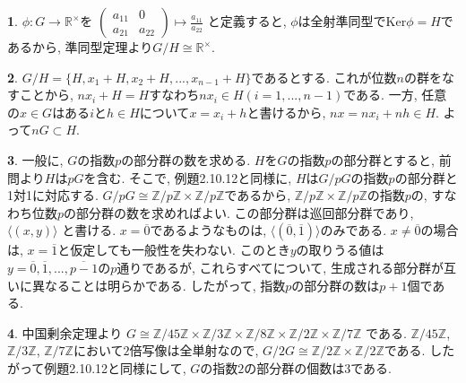 \documentclass{amsart}
\theoremstyle{definition}
\newtheorem{ans}{}
\numberwithin{ans}{subsection}
\newcommand{\Z}[1]{\mathbb{Z}/#1\mathbb{Z}}
\begin{document}
\begin{ans}
  $\phi: G \rightarrow \mathbb{R}^\times$を
  $\begin{pmatrix}
    a_{11} & 0 \\
    a_{21} & a_{22}
  \end{pmatrix} \mapsto \frac{a_{11}}{a_{22}}$
  と定義すると, $\phi$は全射準同型で$\mathrm{Ker}\phi = H$であるから,
  準同型定理より$G/H \cong \mathbb{R}^\times$.
\end{ans}

\begin{ans}
  $G/H = \{H, x_1 + H, x_2 + H,..., x_{n-1} + H\}$であるとする.
  これが位数$n$の群をなすことから, $nx_i + H = H$すなわち$nx_i \in H (i = 1,..., n-1)$である.
  一方, 任意の$x \in G$はある$i$と$h \in H$について$x = x_i + h$と書けるから,
  $nx = nx_i + nh \in H$. よって$nG \subset H$.
\end{ans}

\begin{ans}
  一般に, $G$の指数$p$の部分群の数を求める.
  $H$を$G$の指数$p$の部分群とすると, 前問より$H$は$pG$を含む.
  そこで, 例題2.10.12と同様に, $H$は$G/pG$の指数$p$の部分群と1対1に対応する.
  $G/pG \cong \Z{p} \times \Z{p}$であるから,
  $\Z{p} \times \Z{p}$の指数$p$の, すなわち位数$p$の部分群の数を求めればよい.
  この部分群は巡回部分群であり, $\langle(x, y)\rangle$ と書ける.
  $x = \overline{0}$であるようなものは, $\langle(\overline{0}, \overline{1})\rangle$のみである.
  $x \neq \overline{0}$の場合は, $x = \overline{1}$と仮定しても一般性を失わない.
  このとき$y$の取りうる値は$y = \overline{0}, \overline{1},..., \overline{p-1}$の$p$通りであるが,
  これらすべてについて, 生成される部分群が互いに異なることは明らかである.
  したがって, 指数$p$の部分群の数は$p + 1$個である.
\end{ans}

\begin{ans}
  中国剰余定理より
  $G \cong \Z{45} \times \Z{3} \times \Z{8} \times \Z{2} \times \Z{7}$
  である. $\Z{45}$, $\Z{3}$, $\Z{7}$において$2$倍写像は全単射なので,
  $G/2G \cong \Z{2} \times \Z{2}$である.
  したがって例題2.10.12と同様にして, $G$の指数$2$の部分群の個数は$3$である.
\end{ans}
\end{document}
